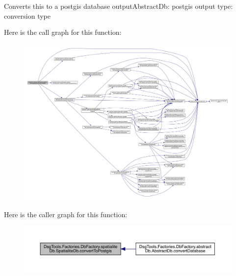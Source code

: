 \begin{DoxyVerb}Converts this to a postgis database
outputAbstractDb: postgis output
type: conversion type
\end{DoxyVerb}
 Here is the call graph for this function\+:
\nopagebreak
\begin{figure}[H]
\begin{center}
\leavevmode
\includegraphics[width=350pt]{class_dsg_tools_1_1_factories_1_1_db_factory_1_1spatialite_db_1_1_spatialite_db_a06dd9cc920f62cd988d92bcedabf5a88_cgraph}
\end{center}
\end{figure}
Here is the caller graph for this function\+:
\nopagebreak
\begin{figure}[H]
\begin{center}
\leavevmode
\includegraphics[width=350pt]{class_dsg_tools_1_1_factories_1_1_db_factory_1_1spatialite_db_1_1_spatialite_db_a06dd9cc920f62cd988d92bcedabf5a88_icgraph}
\end{center}
\end{figure}
\mbox{\label{class_dsg_tools_1_1_factories_1_1_db_factory_1_1spatialite_db_1_1_spatialite_db_ad44549f7cd859c8e5599f35e9effc72c}} 
